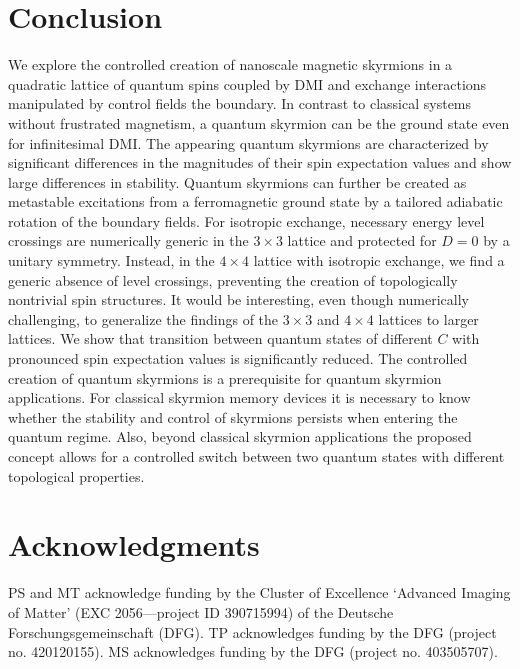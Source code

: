 \documentclass[reprint,aps,prb,superscriptaddress,10pt]{revtex4-2} %
\newcommand{\beginsupplement}{%
	\setcounter{table}{0}
	\renewcommand{\thetable}{A\arabic{table}}%
	\setcounter{figure}{0}
	\renewcommand{\thefigure}{A\arabic{figure}}%
	\setcounter{equation}{0}
	\renewcommand{\theequation}{A\arabic{equation}}%
}
\begin{document}
\section{Conclusion}\label{SecConclusion}
We explore the controlled creation of nanoscale magnetic skyrmions in a quadratic lattice of quantum spins coupled by DMI and exchange interactions manipulated by control fields the boundary. In contrast to classical systems without frustrated magnetism,  a quantum skyrmion can be the ground state even for infinitesimal DMI. The appearing quantum skyrmions are characterized by significant differences in the magnitudes of their spin expectation values and show large differences in stability.
Quantum skyrmions can further be created as metastable excitations from a ferromagnetic ground state by a tailored adiabatic rotation of the boundary fields. 
For isotropic exchange, necessary energy level crossings are numerically generic in the $3\times3$ lattice and protected for $D=0$ by a unitary symmetry. Instead, in the $4\times4$ lattice with isotropic exchange, we find a generic absence of level crossings, preventing the creation of topologically nontrivial spin structures. 
It would be interesting, even though numerically challenging, to generalize the findings of the $3\times3$ and $4\times4$ lattices to larger lattices.
We show that transition between quantum states of different $C$ with pronounced spin expectation values is significantly reduced.
The controlled creation of quantum skyrmions is a prerequisite for quantum skyrmion applications. For classical skyrmion memory devices it is necessary to know whether the stability and control of skyrmions persists when entering the quantum regime.
Also, beyond classical skyrmion applications the proposed concept allows for a controlled switch between two quantum states with different topological properties.\\
\section{Acknowledgments}
PS and MT acknowledge funding by the Cluster of Excellence 
‘Advanced Imaging of Matter’ (EXC 2056—project ID 390715994) of the Deutsche 
Forschungsgemeinschaft (DFG). TP acknowledges funding by the DFG (project no. 420120155). MS acknowledges funding by the DFG (project no. 403505707).
\FloatBarrier
%
%
%

\appendix
\clearpage
\onecolumngrid
\beginsupplement
\end{document}
